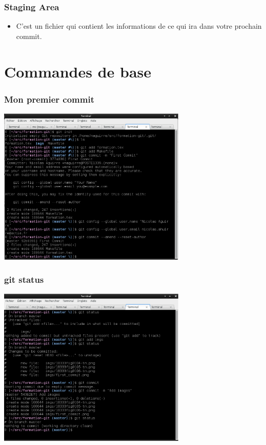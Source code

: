 \documentclass{beamer}
\begin{document}
  \begin{frame}
     \frametitle{Staging Area}
     \begin{itemize}
     \item C'est un fichier qui contient les informations de ce qui ira dans votre prochain commit.
     \end{itemize}
   \end{frame}


\section{Commandes de base}

  \begin{frame}
     \frametitle{Mon premier commit}
     \begin{center}
       \includegraphics[width=9cm]{imgs/first_commit.eps}
     \end{center}
  \end{frame}

  \begin{frame}
     \frametitle{git status}
     \begin{center}
       \includegraphics[width=9cm]{imgs/status.eps}
     \end{center}
  \end{frame}
\end{document}
